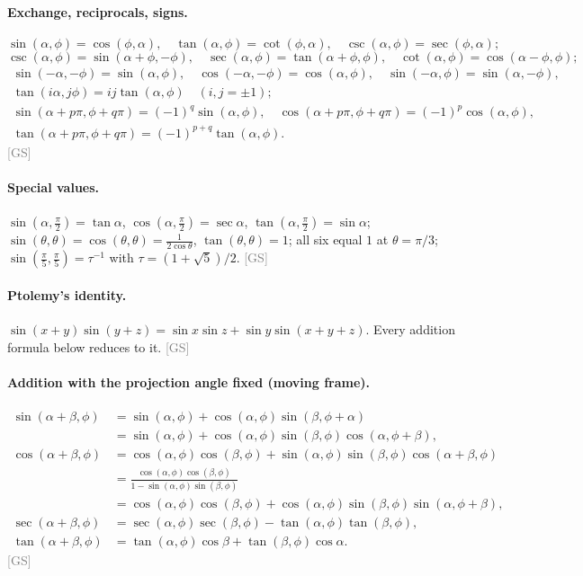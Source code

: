 \documentclass[11pt]{article}
\newcommand{\src}[1]{\hfill{\small\textcolor{gray}{[#1]}}}
\begin{document}
\paragraph{Exchange, reciprocals, signs.}
\[
\sin(\alpha,\phi) = \cos(\phi,\alpha),\quad \tan(\alpha,\phi) = \cot(\phi,\alpha),\quad
\csc(\alpha,\phi) = \sec(\phi,\alpha);
\]
\[
\csc(\alpha,\phi) = \sin(\alpha+\phi,-\phi),\quad
\sec(\alpha,\phi) = \tan(\alpha+\phi,\phi),\quad
\cot(\alpha,\phi) = \cos(\alpha-\phi,\phi);
\]
\begin{gather*}
\sin(-\alpha,-\phi) = \sin(\alpha,\phi),\quad \cos(-\alpha,-\phi) = \cos(\alpha,\phi),\quad
\sin(-\alpha,\phi) = \sin(\alpha,-\phi),\\ \tan(i\alpha,j\phi) = ij\tan(\alpha,\phi)\quad (i,j = \pm1);\\
\sin(\alpha+p\pi,\phi+q\pi) = (-1)^q\sin(\alpha,\phi),\quad
\cos(\alpha+p\pi,\phi+q\pi) = (-1)^p\cos(\alpha,\phi),\\
\tan(\alpha+p\pi,\phi+q\pi) = (-1)^{p+q}\tan(\alpha,\phi).
\end{gather*}\src{GS}

\paragraph{Special values.}
$\sin(\alpha,\tfrac\pi2) = \tan\alpha$, $\cos(\alpha,\tfrac\pi2) = \sec\alpha$,
$\tan(\alpha,\tfrac\pi2) = \sin\alpha$; $\sin(\theta,\theta) = \cos(\theta,\theta) = \tfrac{1}{2\cos\theta}$,
$\tan(\theta,\theta) = 1$; all six equal $1$ at $\theta = \pi/3$; $\sin(\tfrac\pi5,\tfrac\pi5) = \tau^{-1}$
with $\tau = (1+\sqrt5)/2$. \src{GS}

\paragraph{Ptolemy's identity.}
$\sin(x+y)\sin(y+z) = \sin x\sin z + \sin y\sin(x+y+z)$. Every addition formula below reduces to it. \src{GS}

\paragraph{Addition with the projection angle fixed (moving frame).}
\begin{align*}
\sin(\alpha+\beta,\phi) &= \sin(\alpha,\phi) + \cos(\alpha,\phi)\sin(\beta,\phi+\alpha)\\
 &= \sin(\alpha,\phi) + \cos(\alpha,\phi)\sin(\beta,\phi)\cos(\alpha,\phi+\beta),\\
\cos(\alpha+\beta,\phi) &= \cos(\alpha,\phi)\cos(\beta,\phi) + \sin(\alpha,\phi)\sin(\beta,\phi)\cos(\alpha+\beta,\phi)\\
 &= \frac{\cos(\alpha,\phi)\cos(\beta,\phi)}{1-\sin(\alpha,\phi)\sin(\beta,\phi)}\\
 &= \cos(\alpha,\phi)\cos(\beta,\phi) + \cos(\alpha,\phi)\sin(\beta,\phi)\sin(\alpha,\phi+\beta),\\
\sec(\alpha+\beta,\phi) &= \sec(\alpha,\phi)\sec(\beta,\phi) - \tan(\alpha,\phi)\tan(\beta,\phi),\\
\tan(\alpha+\beta,\phi) &= \tan(\alpha,\phi)\cos\beta + \tan(\beta,\phi)\cos\alpha .
\end{align*}\src{GS}
\end{document}
